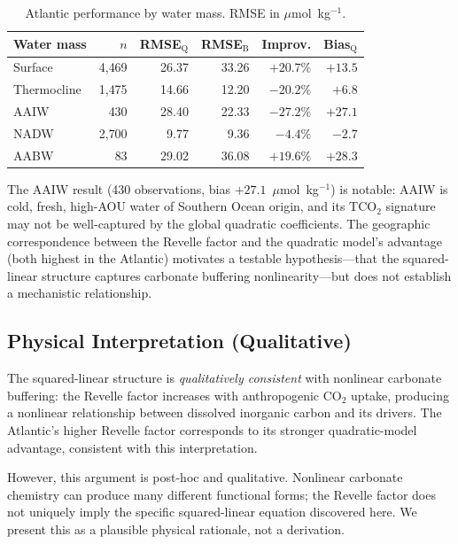\documentclass[12pt,a4paper]{article}
\begin{document}
\begin{table}[htbp]
\centering
\caption{Atlantic performance by water mass. RMSE in $\mu$mol~kg$^{-1}$.}
\label{tab:watermass}
\begin{tabular}{l rrrr r}
\toprule
\textbf{Water mass} & $n$ & RMSE$_{\text{Q}}$ & RMSE$_{\text{B}}$ & \textbf{Improv.} & \textbf{Bias$_{\text{Q}}$} \\
\midrule
Surface     & 4{,}469 & 26.37 & 33.26 & $+20.7\%$ & $+13.5$ \\
Thermocline & 1{,}475 & 14.66 & 12.20 & $-20.2\%$ & $+6.8$ \\
AAIW        & 430     & 28.40 & 22.33 & $-27.2\%$ & $+27.1$ \\
NADW        & 2{,}700 & 9.77  & 9.36  & $-4.4\%$  & $-2.7$ \\
AABW        & 83      & 29.02 & 36.08 & $+19.6\%$ & $+28.3$ \\
\bottomrule
\end{tabular}
\end{table}

The AAIW result (430 observations, bias $+27.1$~$\mu$mol~kg$^{-1}$) is notable: AAIW is cold, fresh, high-AOU water of Southern Ocean origin, and its TCO$_2$ signature may not be well-captured by the global quadratic coefficients. The geographic correspondence between the Revelle factor and the quadratic model's advantage (both highest in the Atlantic) motivates a testable hypothesis---that the squared-linear structure captures carbonate buffering nonlinearity---but does not establish a mechanistic relationship.

\subsection{Physical Interpretation (Qualitative)}

The squared-linear structure is \emph{qualitatively consistent} with nonlinear carbonate buffering: the Revelle factor increases with anthropogenic CO$_2$ uptake, producing a nonlinear relationship between dissolved inorganic carbon and its drivers. The Atlantic's higher Revelle factor corresponds to its stronger quadratic-model advantage, consistent with this interpretation.

However, this argument is post-hoc and qualitative. Nonlinear carbonate chemistry can produce many different functional forms; the Revelle factor does not uniquely imply the specific squared-linear equation discovered here. We present this as a plausible physical rationale, not a derivation.
\end{document}
